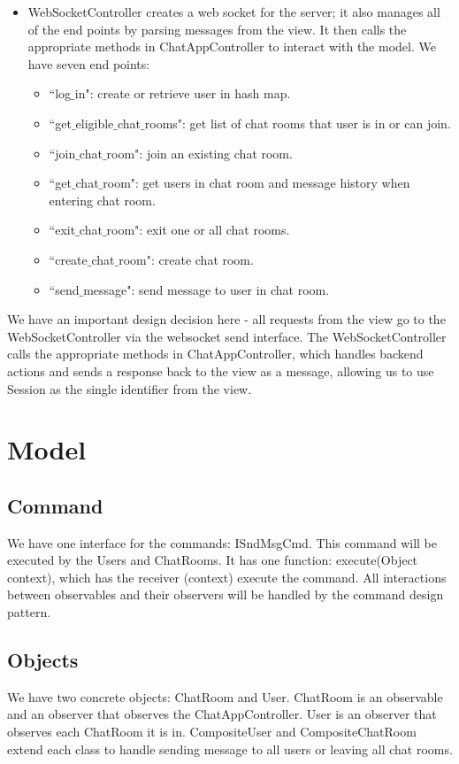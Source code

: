 \documentclass[letterpaper, 11pt]{article}
\begin{document}
\begin{itemize}
\item WebSocketController creates a web socket for the server; it also manages all of the end points by parsing messages from the view. It then calls the appropriate methods in ChatAppController to interact with the model. We have seven end points:
\begin{itemize}
  \item ``log$\_$in": create or retrieve user in hash map.
  \item ``get$\_$eligible$\_$chat$\_$rooms": get list of chat rooms that user is in or can join.
  \item ``join$\_$chat$\_$room": join an existing chat room.
  \item ``get$\_$chat$\_$room": get users in chat room and message history when entering chat room.
  \item ``exit$\_$chat$\_$room": exit one or all chat rooms.
  \item ``create$\_$chat$\_$room": create chat room.
  \item ``send$\_$message": send message to user in chat room.
\end{itemize}
\end{itemize}

We have an important design decision here - all requests from the view go to the WebSocketController via the websocket send interface. The WebSocketController calls the appropriate methods in ChatAppController, which handles backend actions and sends a response back to the view as a message, allowing us to use Session as the single identifier from the view. 

\section{Model}
\subsection{Command}
We have one interface for the commands: ISndMsgCmd. This command will be executed by the Users and ChatRooms. It has one function: execute(Object context), which has the receiver (context) execute the command. All interactions between observables and their observers will be handled by the command design pattern.

\subsection{Objects}
We have two concrete objects: ChatRoom and User. ChatRoom is an observable and an observer that observes the ChatAppController. User is an observer that observes each ChatRoom it is in. CompositeUser and CompositeChatRoom extend each class to handle sending message to all users or leaving all chat rooms.
\end{document}
